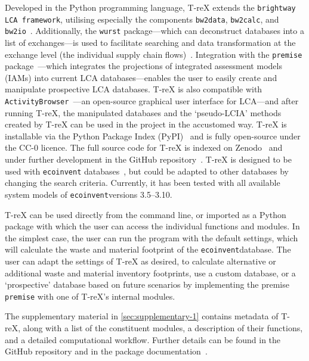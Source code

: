 \documentclass[a4paper,fleqn]{cas-dc}
\begin{document}
Developed in the Python programming language, T-reX extends the \texttt{brightway LCA framework}, utilising especially the components
\texttt{bw2data}, \texttt{bw2calc}, and
\texttt{bw2io}~\citep{mutel2017brightway}. Additionally, the \texttt{wurst}
package---which can deconstruct databases into a list of exchanges---is used to
facilitate searching and data transformation at the exchange level (the
individual supply chain flows)~\citep{mutel2017wurst}. Integration with the
\texttt{premise} package~\citep{sacchi2022premise}---which integrates the
projections of integrated assessment models (IAMs) into current LCA
databases---enables the user to easily create and manipulate prospective LCA
databases. T-reX is also compatible with
\texttt{ActivityBrowser}~\citep{steubing2020activitybrowser}---an open-source
graphical user interface for LCA---and after running T-reX, the manipulated
databases and the `pseudo-LCIA' methods created by T-reX can be used in the
project in the accustomed way. T-reX is installable via the Python Package
Index (PyPI)~\citep{mcdowall2023T-reXpipy} and is fully open-source under the
CC-0 licence. The full source code for T-reX is indexed on
Zenodo~\citep{mcdowall2023T-reXzenodo} and under further development in the
GitHub repository~\citep{mcdowall2024T-reXgithub}. T-reX is designed to be used
with \texttt{ecoinvent} databases~\citep{ecoinvent2016version3}, but could be
adapted to other databases by changing the search criteria. Currently, it has
been tested with all available system models of \texttt{ecoinvent}versions
3.5--3.10.

T-reX can be used directly from the command line, or imported as a Python
package with which the user can access the individual functions and modules. In
the simplest case, the user can run the program with the default settings,
which will calculate the waste and material footprint of the
\texttt{ecoinvent}database. The user can adapt the settings of T-reX as
desired, to calculate alternative or additional waste and material inventory
footprints, use a custom database, or a `prospective' database based on future
scenarios by implementing the premise \texttt{premise} with one of T-reX's
internal modules.

The supplementary material in \autoref{sec:supplementary-1} contains metadata of
T-reX, along with a list of the constituent modules, a description of their
functions, and a detailed computational workflow. Further details can be found
in the GitHub repository and in the package documentation~\citep{mcdowall2024T-reXgithub, mcdowall2023T-reXdocs}.
\end{document}
